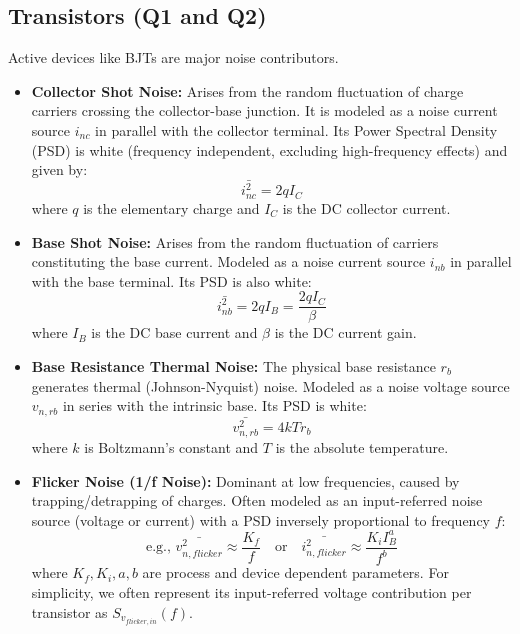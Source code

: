 \documentclass[11pt]{article}
\begin{document}
\subsection{Transistors (Q1 and Q2)}
Active devices like BJTs are major noise contributors.
\begin{itemize}
    \item \textbf{Collector Shot Noise:} Arises from the random fluctuation of charge carriers crossing the collector-base junction. It is modeled as a noise current source $i_{nc}$ in parallel with the collector terminal. Its Power Spectral Density (PSD) is white (frequency independent, excluding high-frequency effects) and given by:
    \begin{equation}
        \bar{i^2_{nc}} = 2 q I_C
    \end{equation}
    where $q$ is the elementary charge and $I_C$ is the DC collector current.

    \item \textbf{Base Shot Noise:} Arises from the random fluctuation of carriers constituting the base current. Modeled as a noise current source $i_{nb}$ in parallel with the base terminal. Its PSD is also white:
    \begin{equation}
        \bar{i^2_{nb}} = 2 q I_B = \frac{2 q I_C}{\beta}
    \end{equation}
    where $I_B$ is the DC base current and $\beta$ is the DC current gain.

    \item \textbf{Base Resistance Thermal Noise:} The physical base resistance $r_b$ generates thermal (Johnson-Nyquist) noise. Modeled as a noise voltage source $v_{n,rb}$ in series with the intrinsic base. Its PSD is white:
    \begin{equation}
        \bar{v^2_{n,rb}} = 4 k T r_b
    \end{equation}
    where $k$ is Boltzmann's constant and $T$ is the absolute temperature.

    \item \textbf{Flicker Noise (1/f Noise):} Dominant at low frequencies, caused by trapping/detrapping of charges. Often modeled as an input-referred noise source (voltage or current) with a PSD inversely proportional to frequency $f$:
    \begin{equation}
        \text{e.g., } \bar{v^2_{n,flicker}} \approx \frac{K_f}{f} \quad \text{or} \quad \bar{i^2_{n,flicker}} \approx \frac{K_i I_B^a}{f^b}
    \end{equation}
    where $K_f, K_i, a, b$ are process and device dependent parameters. For simplicity, we often represent its input-referred voltage contribution per transistor as $S_{v_{flicker,in}}(f)$.
\end{itemize}
\end{document}

